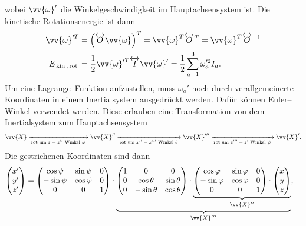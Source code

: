 \documentclass[a4paper,12pt]{article}
\numberwithin{equation}{section}
\begin{document}
wobei $\vv{\omega }'$ die Winkelgeschwindigkeit im Hauptachsensystem ist. Die kinetische Rotationsenergie ist dann
\begin{align*}
        \vv{\omega }'^T&=\left(\overleftrightarrow{O}\vv{\omega }\right)^T=\vv{\omega }^T\overleftrightarrow{O}^T=\vv{\omega }^T\overleftrightarrow{O}^{-1}\\
        E_{\,\text{kin}\,,\,\text{rot}\,}&=\dfrac{1}{2}\vv{\omega }'^T\overleftrightarrow{I}\vv{\omega }'=\dfrac{1}{2}\sum_{a=1}^{3}\omega _a'^2I_a
.\end{align*}
Um eine Lagrange--Funktion aufzustellen, muss $\omega _a'$ noch durch verallgemeinerte Koordinaten in einem Inertialsystem ausgedrückt werden. Dafür können Euler--Winkel verwendet werden. Diese erlauben eine Transformation von dem Inertialsystem zum Hauptachsensystem
\[ 
        \vv{X}\xrightarrow[\,\text{rot um $z=z''$}\,\,\text{Winkel $\varphi $}\,]{} \vv{X}''\xrightarrow [\,\text{rot um $x''=x'''$}\,\,\text{Winkel $\theta $}\,]{}\vv{X}'''\xrightarrow [\,\text{rot um $z'''=z'$}\,\,\text{Winkel $\psi $}\,]{}\vv{X}'
.\] 
Die gestrichenen Koordinaten sind dann
\begin{align*}
        \begin{pmatrix}
        x'\\y'\\z'
        \end{pmatrix}&=\begin{pmatrix}
        \cos \psi &\sin \psi &0\\
        -\sin \psi &\cos \psi &0\\
        0&0&1
        \end{pmatrix}\cdot \underbrace{\begin{pmatrix}
        1&0&0\\
        0&\cos \theta &\sin \theta \\
        0&-\sin \theta &\cos \theta 
        \end{pmatrix}\cdot \underbrace{\begin{pmatrix}
        \cos \varphi &\sin \varphi &0\\
        -\sin \varphi &\cos \varphi &0\\
        0&0&1
        \end{pmatrix}\cdot \begin{pmatrix}
        x\\y\\z
        \end{pmatrix}}_{\vv{X}''}}_{\vv{X}'''}
,\end{align*}
\end{document}

